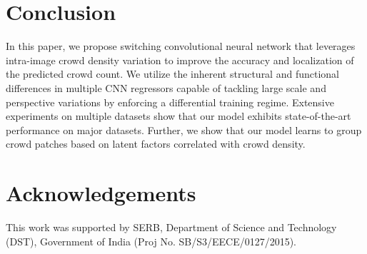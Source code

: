 \documentclass[10pt,twocolumn,letterpaper]{article}
\begin{document}



\section{Conclusion}
In this paper, we propose switching convolutional neural network that leverages intra-image crowd density variation to improve the accuracy and localization of the predicted crowd count. We utilize the inherent structural and functional differences in multiple CNN regressors capable of tackling large scale and perspective variations by enforcing a differential training regime. Extensive experiments on multiple datasets show that our model exhibits state-of-the-art performance on major datasets. Further, we show that our model learns to group crowd patches based on latent factors correlated with crowd density.



\section{Acknowledgements}
This work was supported by SERB, Department of Science and Technology (DST), Government of India (Proj No. SB/S3/EECE/0127/2015).



{\small


}
\end{document}
